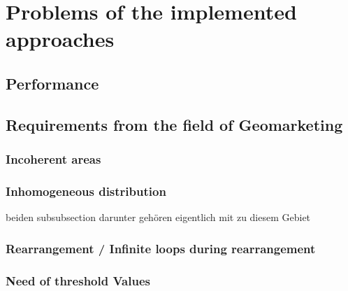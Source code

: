 \section{Problems of the implemented approaches}
\subsection{Performance}
\subsection{Requirements from the field of Geomarketing}
\subsubsection{Incoherent areas}
\subsubsection{Inhomogeneous distribution}

beiden subsubsection darunter gehören eigentlich mit zu diesem Gebiet

\subsubsection{Rearrangement / Infinite loops during rearrangement}
\subsubsection{Need of threshold Values}